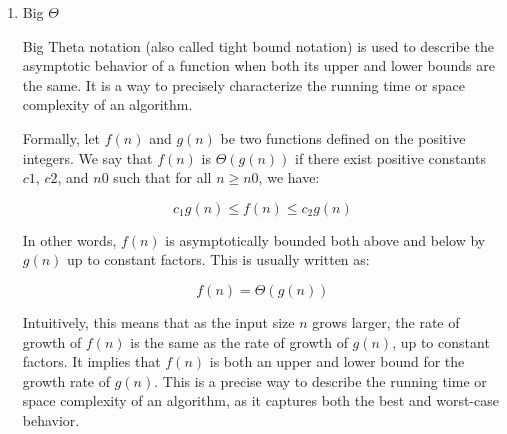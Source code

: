 \documentclass{article}
\begin{document}
\begin{enumerate}
\begin{enumerate}
    \item Big $\Theta$
    
    Big Theta notation (also called tight bound notation) is used to describe the asymptotic behavior of a function when both its upper and lower bounds are the same. It is a way to precisely characterize the running time or space complexity of an algorithm.

    Formally, let $f(n)$ and $g(n)$ be two functions defined on the positive integers. We say that $f(n)$ is $\Theta(g(n))$ if there exist positive constants $c1$, $c2$, and $n0$ such that for all $n \geq n0$, we have:
    
    $$c_1 g(n) \leq f(n) \leq c_2 g(n)$$
    
    In other words, $f(n)$ is asymptotically bounded both above and below by $g(n)$ up to constant factors. This is usually written as:
    
    $$f(n) = \Theta(g(n))$$
    
    Intuitively, this means that as the input size $n$ grows larger, the rate of growth of $f(n)$ is the same as the rate of growth of $g(n)$, up to constant factors. It implies that $f(n)$ is both an upper and lower bound for the growth rate of $g(n)$. This is a precise way to describe the running time or space complexity of an algorithm, as it captures both the best and worst-case behavior.

\end{enumerate}


\end{enumerate}
\end{document}
